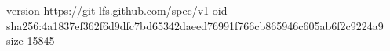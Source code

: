 version https://git-lfs.github.com/spec/v1
oid sha256:4a1837ef362f6d9dfc7bd65342daeed76991f766cb865946c605ab6f2c9224a9
size 15845
